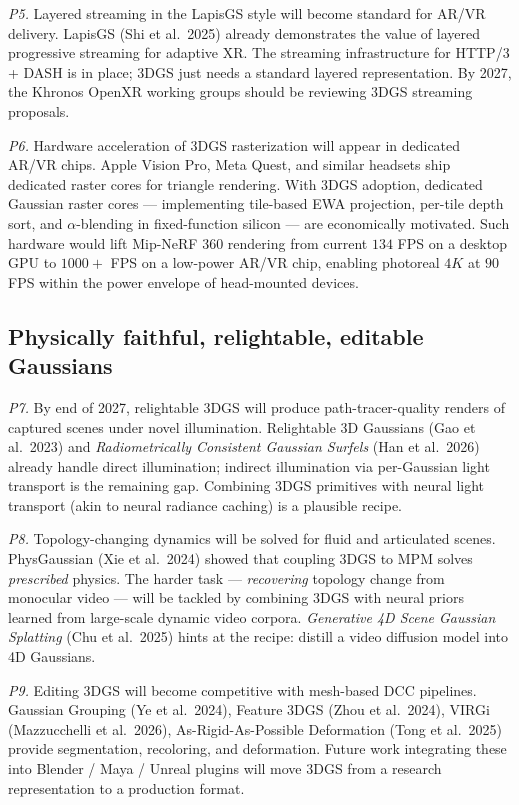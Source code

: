 \emph{P5.} Layered streaming in the LapisGS style will become standard for AR/VR delivery. LapisGS (Shi et al.~2025) already demonstrates the value of layered progressive streaming for adaptive XR. The streaming infrastructure for HTTP/3 + DASH is in place; 3DGS just needs a standard layered representation. By 2027, the Khronos OpenXR working groups should be reviewing 3DGS streaming proposals.

\emph{P6.} Hardware acceleration of 3DGS rasterization will appear in dedicated AR/VR chips. Apple Vision Pro, Meta Quest, and similar headsets ship dedicated raster cores for triangle rendering. With 3DGS adoption, dedicated Gaussian raster cores --- implementing tile-based EWA projection, per-tile depth sort, and \(\alpha\)-blending in fixed-function silicon --- are economically motivated. Such hardware would lift Mip-NeRF 360 rendering from current \(134\) FPS on a desktop GPU to \(1000+\) FPS on a low-power AR/VR chip, enabling photoreal \(4K\) at \(90\) FPS within the power envelope of head-mounted devices.

\subsection{Physically faithful, relightable, editable Gaussians}\label{physically-faithful-relightable-editable-gaussians}

\emph{P7.} By end of 2027, relightable 3DGS will produce path-tracer-quality renders of captured scenes under novel illumination. Relightable 3D Gaussians (Gao et al.~2023) and \emph{Radiometrically Consistent Gaussian Surfels} (Han et al.~2026) already handle direct illumination; indirect illumination via per-Gaussian light transport is the remaining gap. Combining 3DGS primitives with neural light transport (akin to neural radiance caching) is a plausible recipe.

\emph{P8.} Topology-changing dynamics will be solved for fluid and articulated scenes. PhysGaussian (Xie et al.~2024) showed that coupling 3DGS to MPM solves \emph{prescribed} physics. The harder task --- \emph{recovering} topology change from monocular video --- will be tackled by combining 3DGS with neural priors learned from large-scale dynamic video corpora. \emph{Generative 4D Scene Gaussian Splatting} (Chu et al.~2025) hints at the recipe: distill a video diffusion model into 4D Gaussians.

\emph{P9.} Editing 3DGS will become competitive with mesh-based DCC pipelines. Gaussian Grouping (Ye et al.~2024), Feature 3DGS (Zhou et al.~2024), VIRGi (Mazzucchelli et al.~2026), As-Rigid-As-Possible Deformation (Tong et al.~2025) provide segmentation, recoloring, and deformation. Future work integrating these into Blender / Maya / Unreal plugins will move 3DGS from a research representation to a production format.

